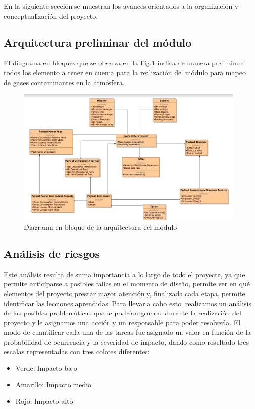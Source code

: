 \documentclass[titlepage,11pt]{article}
\begin{document}
En la siguiente sección se muestran los avances orientados a la organización y conceptualización del proyecto.

\subsection{Arquitectura preliminar del módulo}

El diagrama en bloques que se observa en la Fig.\ref{fig:payload} indica de manera preliminar todos los elemento a tener en cuenta para la realización del módulo para mapeo de gases contaminantes en la atmósfera.



\begin{figure}[htb!]
    \centering
    \includegraphics[width=15cm]{fig/payload.png}
    \caption{Diagrama en bloque de la arquitectura del módulo}
    \label{fig:payload}
\end{figure}

\subsection{Análisis de riesgos}

Este análisis resulta de suma importancia a lo largo de todo el proyecto, ya que permite anticiparse a posibles fallas en el momento de diseño, permite ver en qué elementos del proyecto prestar mayor atención y, finalizada cada etapa, permite identificar las lecciones aprendidas.
Para llevar a cabo esto, realizamos un análisis de las posibles problemáticas que se podrían generar durante la realización del proyecto y le asignamos una acción y un responsable para poder resolverla. El modo de cuantificar cada una de las tareas fue asignado un valor en función de la probabilidad de ocurrencia y la severidad de impacto, dando como resultado tres escalas representadas con tres colores diferentes:
\begin{itemize}
    \item Verde: Impacto bajo
    \item Amarillo: Impacto medio
    \item Rojo: Impacto alto
\end{itemize}
\end{document}
